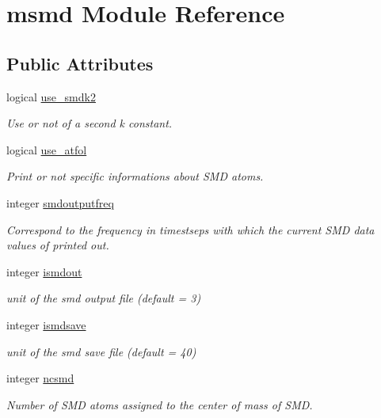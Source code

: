 \hypertarget{classmsmd}{\section{msmd Module Reference}
\label{classmsmd}
}
\subsection*{Public Attributes}
\begin{DoxyCompactItemize}
\item 
logical \hyperlink{classmsmd_a8394605ebe4793bedcc802719a1e0183}{use\-\_\-smdk2}
\begin{DoxyCompactList}\small\item\em Use or not of a second k constant. \end{DoxyCompactList}\item 
logical \hyperlink{classmsmd_aca46d500e14101f21a92d03f2a41d76e}{use\-\_\-atfol}
\begin{DoxyCompactList}\small\item\em Print or not specific informations about S\-M\-D atoms. \end{DoxyCompactList}\item 
integer \hyperlink{classmsmd_a3e8ffd20ee86a6e8fc6a0f028ad70495}{smdoutputfreq}
\begin{DoxyCompactList}\small\item\em Correspond to the frequency in timestseps with which the current S\-M\-D data values of printed out. \end{DoxyCompactList}\item 
integer \hyperlink{classmsmd_a3d7ff9b73382ccebdf42c0c5a01e673c}{ismdout}
\begin{DoxyCompactList}\small\item\em unit of the smd output file (default = 3) \end{DoxyCompactList}\item 
integer \hyperlink{classmsmd_a2d12edd4b10d02323b29a0deb6e1547f}{ismdsave}
\begin{DoxyCompactList}\small\item\em unit of the smd save file (default = 40) \end{DoxyCompactList}\item 
integer \hyperlink{classmsmd_afc4ebe744a30fd19f67574e691308829}{ncsmd}
\begin{DoxyCompactList}\small\item\em Number of S\-M\-D atoms assigned to the center of mass of S\-M\-D. \end{DoxyCompactList}\item 

\end{DoxyCompactItemize}

